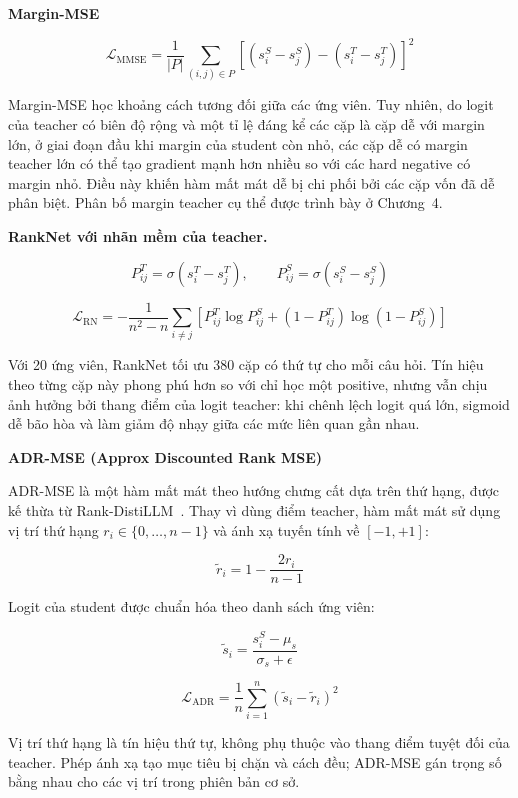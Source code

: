 \documentclass[../DoAn.tex]{subfiles}
\begin{document}
\noindent\textbf{Margin-MSE}

\[
\mathcal{L}_{\text{MMSE}}
=
\frac{1}{|P|}
\sum_{(i,j)\in P}
\left[
(s_i^S-s_j^S)
-
(s_i^T-s_j^T)
\right]^2
\]

Margin-MSE học khoảng cách tương đối giữa các ứng viên. Tuy nhiên, do logit của teacher có biên độ rộng và một tỉ lệ đáng kể các cặp là cặp dễ với margin lớn, ở giai đoạn đầu khi margin của student còn nhỏ, các cặp dễ có margin teacher lớn có thể tạo gradient mạnh hơn nhiều so với các hard negative có margin nhỏ. Điều này khiến hàm mất mát dễ bị chi phối bởi các cặp vốn đã dễ phân biệt. Phân bố margin teacher cụ thể được trình bày ở Chương~4.

\noindent\textbf{RankNet với nhãn mềm của teacher.}

\[
P_{ij}^T=\sigma(s_i^T-s_j^T),
\qquad
P_{ij}^S=\sigma(s_i^S-s_j^S)
\]

\[
\mathcal{L}_{\text{RN}}
=
-\frac{1}{n^2-n}
\sum_{i\neq j}
\left[
P_{ij}^T\log P_{ij}^S
+
(1-P_{ij}^T)\log(1-P_{ij}^S)
\right]
\]

Với 20 ứng viên, RankNet tối ưu 380 cặp có thứ tự cho mỗi câu hỏi. Tín hiệu theo từng cặp này phong phú hơn so với chỉ học một positive, nhưng vẫn chịu ảnh hưởng bởi thang điểm của logit teacher: khi chênh lệch logit quá lớn, sigmoid dễ bão hòa và làm giảm độ nhạy giữa các mức liên quan gần nhau.

\noindent\textbf{ADR-MSE (Approx Discounted Rank MSE)}

ADR-MSE là một hàm mất mát theo hướng chưng cất dựa trên thứ hạng, được kế thừa từ Rank-DistiLLM~\cite{schlatt2025rankdistillm}. Thay vì dùng điểm teacher, hàm mất mát sử dụng vị trí thứ hạng $r_i\in\{0,\ldots,n-1\}$ và ánh xạ tuyến tính về $[-1,+1]$:

\[
\tilde{r}_i
=
1-\frac{2r_i}{n-1}
\]

Logit của student được chuẩn hóa theo danh sách ứng viên:

\[
\tilde{s}_i
=
\frac{s_i^S-\mu_s}{\sigma_s+\epsilon}
\]

\[
\mathcal{L}_{\text{ADR}}
=
\frac{1}{n}
\sum_{i=1}^{n}
\left(\tilde{s}_i-\tilde{r}_i\right)^2
\]

Vị trí thứ hạng là tín hiệu thứ tự, không phụ thuộc vào thang điểm tuyệt đối của teacher. Phép ánh xạ tạo mục tiêu bị chặn và cách đều; ADR-MSE gán trọng số bằng nhau cho các vị trí trong phiên bản cơ sở.
\end{document}
